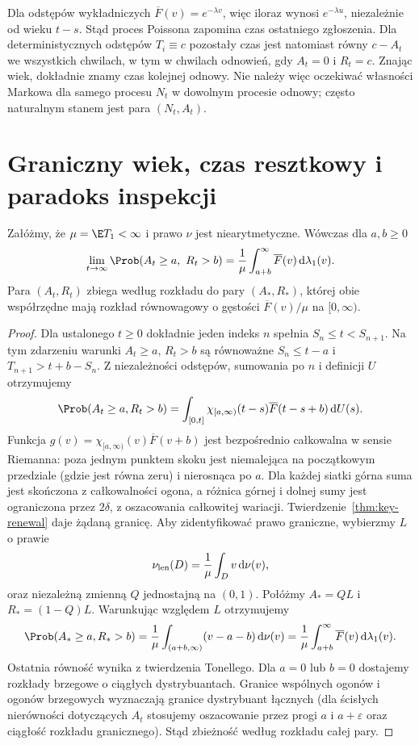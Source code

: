 \begin{przyklad}
Dla odstępów wykładniczych $\overline F(v)=e^{-\lambda v}$,
więc iloraz wynosi $e^{-\lambda u}$, niezależnie od wieku
$t-s$. Stąd proces Poissona zapomina czas ostatniego zgłoszenia.
Dla deterministycznych odstępów $T_i\equiv c$ pozostały czas
jest natomiast równy $c-A_t$ we wszystkich chwilach,
w tym w chwilach odnowień, gdy $A_t=0$ i $R_t=c$. Znając wiek, dokładnie znamy czas kolejnej
odnowy. Nie należy więc oczekiwać własności Markowa dla
samego procesu $N_t$ w dowolnym procesie odnowy; często
naturalnym stanem jest para $(N_t,A_t)$.
\end{przyklad}

\section{Graniczny wiek, czas resztkowy i paradoks inspekcji}

\begin{twierdzenie}
\label{thm:renewal-age-limit}
Załóżmy, że $\mu=\E T_1<\infty$ i prawo $\nu$
jest niearytmetyczne. Wówczas dla $a,b\ge0$
\[
\lim_{t\to\infty}\Prob(A_t\ge a,\ R_t>b)
=\frac1\mu\int_{a+b}^\infty\overline F(v)\,
\mathrm d\lambda_1(v).
\]
Para $(A_t,R_t)$ zbiega według rozkładu do pary
$(A_*,R_*)$, której obie współrzędne mają
rozkład równowagowy o gęstości
$\overline F(v)/\mu$ na $[0,\infty)$.
\end{twierdzenie}
\begin{proof}
Dla ustalonego $t\ge0$ dokładnie jeden indeks $n$
spełnia $S_n\le t<S_{n+1}$.
Na tym zdarzeniu warunki $A_t\ge a$, $R_t>b$
są równoważne $S_n\le t-a$ i $T_{n+1}>t+b-S_n$.
Z niezależności odstępów, sumowania po $n$ i
definicji $U$ otrzymujemy
\[
\Prob(A_t\ge a,R_t>b)
=\int_{[0,t]}\chi_{[a,\infty)}(t-s)
\overline F(t-s+b)\,\mathrm dU(s).
\]
Funkcja $g(v)=\chi_{[a,\infty)}(v)\overline F(v+b)$
jest bezpośrednio całkowalna w sensie Riemanna:
poza jednym punktem skoku jest niemalejąca
na początkowym przedziale (gdzie jest równa zeru)
i nierosnąca po $a$. Dla każdej siatki górna
suma jest skończona z całkowalności ogona,
a różnica górnej i dolnej sumy jest ograniczona
przez $2\delta$, z oszacowania całkowitej wariacji.
Twierdzenie~\ref{thm:key-renewal} daje żądaną granicę.
Aby zidentyfikować prawo graniczne, wybierzmy
$L$ o prawie
\[
\nu_{\rm len}(D)=\frac1\mu\int_D v\,\mathrm d\nu(v),
\]
oraz niezależną zmienną $Q$ jednostajną na $(0,1)$.
Połóżmy $A_*=QL$ i $R_*=(1-Q)L$.
Warunkując względem $L$ otrzymujemy
\[
\Prob(A_*\ge a,R_*>b)
=\frac1\mu\int_{(a+b,\infty)}(v-a-b)\,\mathrm d\nu(v)
=\frac1\mu\int_{a+b}^\infty\overline F(v)\,\mathrm d\lambda_1(v).
\]
Ostatnia równość wynika z twierdzenia Tonellego.
Dla $a=0$ lub $b=0$ dostajemy rozkłady brzegowe
o ciągłych dystrybuantach. Granice wspólnych
ogonów i ogonów brzegowych wyznaczają granice
dystrybuant łącznych (dla ścisłych nierówności
dotyczących $A_t$ stosujemy oszacowanie przez
progi $a$ i $a+\varepsilon$ oraz ciągłość
rozkładu granicznego). Stąd zbieżność według
rozkładu całej pary.
\end{proof}

